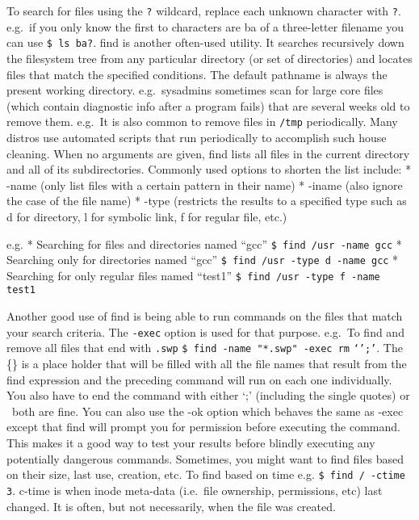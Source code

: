 To search for files using the \texttt{?} wildcard, replace each unknown
character with \texttt{?}. e.g.~if you only know the first to characters
are ba of a three-letter filename you can use \texttt{\$ ls ba?}. find
is another often-used utility. It searches recursively down the
filesystem tree from any particular directory (or set of directories)
and locates files that match the specified conditions. The default
pathname is always the present working directory. e.g.~sysadmins
sometimes scan for large core files (which contain diagnostic info after
a program fails) that are several weeks old to remove them. e.g.~It is
also common to remove files in \texttt{/tmp} periodically. Many distros
use automated scripts that run periodically to accomplish such house
cleaning. When no arguments are given, find lists all files in the
current directory and all of its subdirectories. Commonly used options
to shorten the list include: * -name (only list files with a certain
pattern in their name) * -iname (also ignore the case of the file name)
* -type (restricts the results to a specified type such as d for
directory, l for symbolic link, f for regular file, etc.)

e.g. * Searching for files and directories named ``gcc''
\texttt{\$ find /usr -name gcc} * Searching only for directories named
``gcc'' \texttt{\$ find /usr -type d -name gcc} * Searching for only
regular files named ``test1'' \texttt{\$ find /usr -type f -name test1}

Another good use of find is being able to run commands on the files that
match your search criteria. The \texttt{-exec} option is used for that
purpose. e.g.~To find and remove all files that end with \texttt{.swp}
\texttt{\$ find -name "*.swp" -exec rm} \texttt{`';'}. The \{\} is a
place holder that will be filled with all the file names that result
from the find expression and the preceding command will run on each one
individually. You also have to end the command with either `;'
(including the single quotes) or ~both are fine. You can also use the
-ok option which behaves the same as -exec except that find will prompt
you for permission before executing the command. This makes it a good
way to test your results before blindly executing any potentially
dangerous commands. Sometimes, you might want to find files based on
their size, last use, creation, etc. To find based on time e.g.
\texttt{\$ find / -ctime 3}. c-time is when inode meta-data (i.e.~file
ownership, permissions, etc) last changed. It is often, but not
necessarily, when the file was created.

